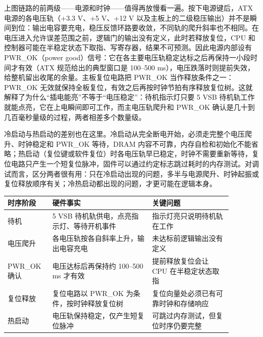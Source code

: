 上图链路的前两级——电源和时钟——值得再放慢看一遍。按下电源键后，ATX 电源的各电压轨（+3.3 V、+5 V、+12 V 以及主板上的二级稳压输出）并不是瞬间到位：输出电容要充电，稳压反馈环路要收敛，不同轨的爬升斜率也不相同。在电压进入允许误差范围之前，逻辑门的输出没有定义，此时若释放复位，CPU 和控制器可能在半稳定状态下取指、写寄存器，结果不可预测。因此电源内部设有 PWR\_OK（power good）信号：它在各主要电压轨稳定达标之后再保持一小段时间才有效（ATX 规范给出的典型窗口是 100--500 ms），电压跌落时则提前失效，给整机留出收尾的余量。主板复位电路把 PWR\_OK 当作释放条件之一：PWR\_OK 无效就保持全板复位，有效之后再按时钟节拍有序释放复位树。这就解释了为什么“插电能亮”不等于“电压稳定”：待机指示灯只要 5 VSB 待机轨工作就能点亮，它在上电瞬间即可工作，而主电压轨爬升和 PWR\_OK 确认是几十到几百毫秒量级的过程，两者相差多个数量级。

冷启动与热启动的差别也在这里。冷启动从完全断电开始，必须走完整个电压爬升、时钟稳定和 PWR\_OK 等待，DRAM 内容不可靠，内存自检和初始化不能省略；热启动（复位键或软件复位）时各电压轨早已稳定，时钟不需要重新等待，复位电路只产生一个短复位脉冲，固件可以通过约定标志跳过耗时的内存测试。对调试而言，区分两者很有用：只在冷启动出现的问题，多半与电源爬升、时钟起振或复位释放顺序有关；冷热启动都出现的问题，才更可能在逻辑本身。

\begin{longtable}{L{0.16\linewidth}L{0.40\linewidth}L{0.32\linewidth}}
\toprule
时序阶段 & 硬件事实 & 关键问题 \\
\midrule
待机 & 5 VSB 待机轨供电，点亮指示灯、等待开机事件 & 指示灯亮只说明待机轨在工作 \\
电压爬升 & 各电压轨按各自斜率上升，输出电容充电 & 未达标前逻辑输出没有定义 \\
PWR\_OK 确认 & 电压达标后再保持约 100--500 ms 才有效 & 提前释放复位会让 CPU 在半稳定状态取指 \\
复位释放 & 复位电路以 PWR\_OK 为条件，按时钟释放复位树 & 复位向量处必须已有可靠时钟和存储响应 \\
热启动 & 电压轨保持稳定，仅产生短复位脉冲 & 可跳过内存测试，但复位时序仍要完整 \\
\bottomrule
\end{longtable}

